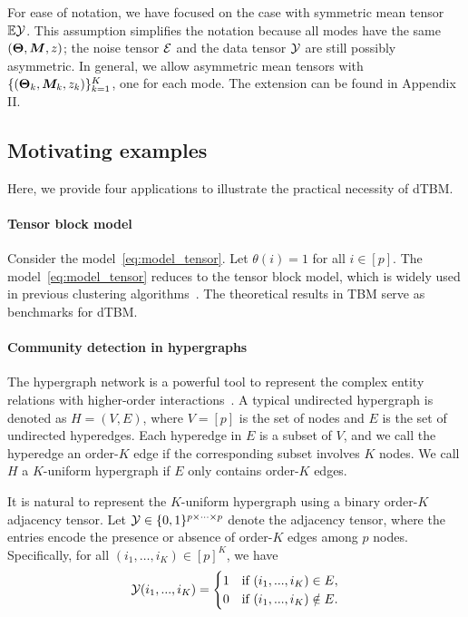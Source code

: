 \documentclass[journal]{IEEEtran}
\theoremstyle{definition}
\theoremstyle{definition}
\begin{document}
For ease of notation, we have focused on the case with symmetric mean tensor $\mathbb{E} \mathcal{Y}$. This assumption simplifies the notation because all modes have the same $(\boldsymbol{\Theta}, \bm M, z)$; the noise tensor $\mathcal{E}$ and the data tensor $\mathcal{Y}$ are still possibly asymmetric. In general, we allow asymmetric mean tensors with $\{(\boldsymbol{\Theta}_k, \bm M_k, z_k)\}_{k=1}^K$, one for each mode. The extension can be found in Appendix II.

\subsection{Motivating examples}\label{subsec:motiv} Here, we provide four applications to illustrate the practical necessity of dTBM.

\paragraph{Tensor block model} Consider the model~\eqref{eq:model_tensor}. Let $\theta(i)=1$ for all $ i \in [p]$. The model~\eqref{eq:model_tensor} reduces to the tensor block model, which is widely used in previous clustering algorithms~\citep{wang2019multiway,chi2020provable,han2020exact}. The theoretical results in TBM serve as benchmarks for dTBM.  

\paragraph{Community detection in hypergraphs} The hypergraph network is a powerful tool to represent the complex entity relations with higher-order interactions~\citep{ke2019community}. A typical undirected hypergraph is denoted as $H = (V,E)$, where $V = [p]$ is the set of nodes and $E$ is the set of undirected hyperedges. Each hyperedge in $E$ is a subset of $V$, and we call the hyperedge an order-$K$ edge if the corresponding subset involves $K$ nodes. We call $H$ a $K$-uniform hypergraph if $E$ only contains order-$K$ edges. 

It is natural to represent the $K$-uniform hypergraph using a binary order-$K$ adjacency tensor. Let $\mathcal{Y} \in \{0,1\}^{p \times \cdots \times p}$ denote the adjacency tensor, where the entries encode the presence or absence of order-$K$ edges among $p$ nodes. Specifically, for all $(i_1,\ldots,i_K) \in [p]^K$, we have
\begin{equation}
    \mathcal{Y}(i_1,...,i_K) =  \begin{cases}
    1  & \text{if }  (i_1,...,i_K) \in E,\\
    0 & \text{if }  (i_1,...,i_K) \notin E.
    \end{cases}
\end{equation}
\end{document}
